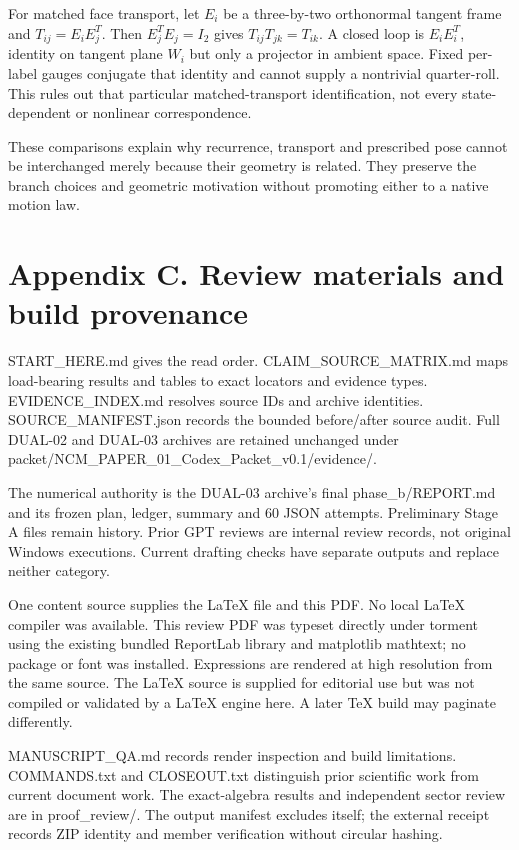 \documentclass[11pt,a4paper]{article}
\begin{document}
For matched face transport, let $E_i$ be a three-by-two orthonormal tangent frame and $T_{ij}=E_iE_j^T$. Then $E_j^TE_j=I_2$ gives $T_{ij}T_{jk}=T_{ik}$. A closed loop is $E_iE_i^T$, identity on tangent plane $W_i$ but only a projector in ambient space. Fixed per-label gauges conjugate that identity and cannot supply a nontrivial quarter-roll. This rules out that particular matched-transport identification, not every state-dependent or nonlinear correspondence. \cite{D02}

These comparisons explain why recurrence, transport and prescribed pose cannot be interchanged merely because their geometry is related. They preserve the branch choices and geometric motivation without promoting either to a native motion law.

\clearpage
\section*{Appendix C. Review materials and build provenance}
START\_HERE.md gives the read order. CLAIM\_SOURCE\_MATRIX.md maps load-bearing results and tables to exact locators and evidence types. EVIDENCE\_INDEX.md resolves source IDs and archive identities. SOURCE\_MANIFEST.json records the bounded before/after source audit. Full DUAL-02 and DUAL-03 archives are retained unchanged under packet/NCM\_PAPER\_01\_Codex\_Packet\_v0.1/evidence/.

The numerical authority is the DUAL-03 archive’s final phase\_b/REPORT.md and its frozen plan, ledger, summary and 60 JSON attempts. Preliminary Stage A files remain history. Prior GPT reviews are internal review records, not original Windows executions. Current drafting checks have separate outputs and replace neither category.

One content source supplies the LaTeX file and this PDF. No local LaTeX compiler was available. This review PDF was typeset directly under torment using the existing bundled ReportLab library and matplotlib mathtext; no package or font was installed. Expressions are rendered at high resolution from the same source. The LaTeX source is supplied for editorial use but was not compiled or validated by a LaTeX engine here. A later TeX build may paginate differently.

MANUSCRIPT\_QA.md records render inspection and build limitations. COMMANDS.txt and CLOSEOUT.txt distinguish prior scientific work from current document work. The exact-algebra results and independent sector review are in proof\_review/. The output manifest excludes itself; the external receipt records ZIP identity and member verification without circular hashing.
\end{document}
